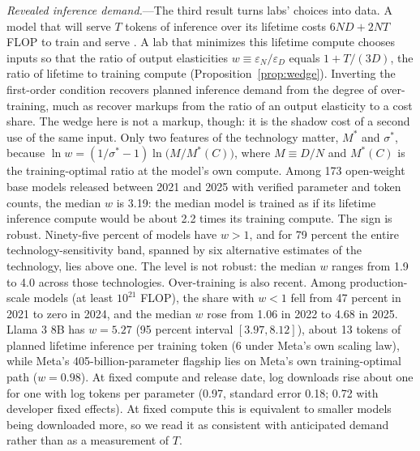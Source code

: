 \textit{Revealed inference demand.}---The third result turns labs' choices into data. A model that will serve $T$
tokens of inference over its lifetime costs $6ND + 2NT$ FLOP to train and serve \citep{sardana2024beyond}. A lab that
minimizes this lifetime compute chooses inputs so that the ratio of output elasticities
$w \equiv \varepsilon_N/\varepsilon_D$ equals $1 + T/(3D)$, the ratio of lifetime to training compute
(Proposition~\ref{prop:wedge}). Inverting the first-order condition recovers planned inference demand from the degree
of over-training, much as \citet{deloecker2012markups} recover markups from the ratio of an output elasticity to a
cost share. The wedge here is not a markup, though: it is the shadow cost of a second use of the same input. Only
two features of the technology matter, $M^*$ and $\sigma^*$, because
$\ln w = (1/\sigma^* - 1)\ln\!\big(M/M^*(C)\big)$, where $M \equiv D/N$ and $M^*(C)$ is the training-optimal ratio
at the model's own compute. Among 173 open-weight base models released
between 2021 and 2025 with verified parameter and token counts, the median $w$ is 3.19: the median model is trained
as if its lifetime inference compute would be about 2.2 times its training compute. The sign is robust. Ninety-five
percent of models have $w > 1$, and for 79 percent the entire technology-sensitivity band, spanned by six
alternative estimates of the technology, lies above one. The level is not robust: the median $w$ ranges from 1.9 to
4.0 across those technologies.
Over-training is also recent. Among production-scale models (at least $10^{21}$ FLOP), the share with $w < 1$ fell from 47 percent in 2021 to
zero in 2024, and the median $w$ rose from 1.06 in 2022 to 4.68 in 2025. Llama 3 8B has $w = 5.27$ (95 percent
interval $[3.97, 8.12]$), about 13 tokens of planned lifetime inference per training token (6 under Meta's own
scaling law), while Meta's 405-billion-parameter flagship lies on Meta's own training-optimal path ($w = 0.98$). At
fixed compute and release date, log downloads rise about one for one with log tokens per parameter (0.97, standard
error 0.18; 0.72 with developer fixed effects). At fixed compute this is equivalent to smaller models being
downloaded more, so we read it as consistent with anticipated demand rather than as a measurement of $T$.

